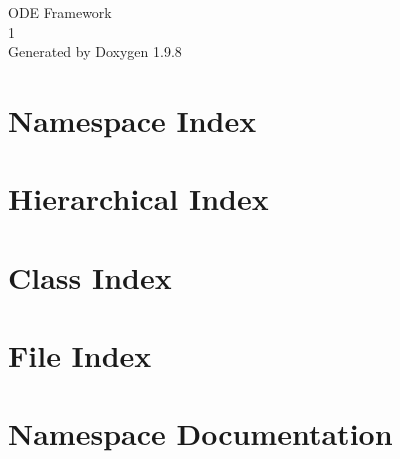 \documentclass[twoside]{book}
\newcommand{\+}{\discretionary{\mbox{\scriptsize$\hookleftarrow$}}{}{}}
\newcommand{\clearemptydoublepage}{%
    \newpage{\pagestyle{empty}\cleardoublepage}%
  }
\begin{document}
  \raggedbottom
    \hypersetup{pageanchor=false,
                bookmarksnumbered=true,
                pdfencoding=unicode
               }
  \begin{titlepage}
  \vspace*{7cm}
  \begin{center}%
  {\Large ODE Framework}\\
  [1ex]\large 1 \\
  \vspace*{1cm}
  {\large Generated by Doxygen 1.9.8}\\
  \end{center}
  \end{titlepage}
  \clearemptydoublepage
  \tableofcontents
  \clearemptydoublepage
  \hypersetup{pageanchor=true}
\chapter{Namespace Index}

\chapter{Hierarchical Index}

\chapter{Class Index}

\chapter{File Index}

\chapter{Namespace Documentation}









\end{document}
